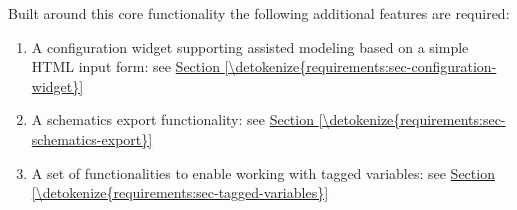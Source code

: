 \documentclass[letterpaper,10pt, openany,english]{sphinxmanual}
\begin{document}
Built around this core functionality the following additional features are required:
\begin{enumerate}
%
\item {} 
A configuration widget supporting assisted modeling based on a simple HTML input form: see \hyperref[\detokenize{requirements:sec-configuration-widget}]{Section \ref{\detokenize{requirements:sec-configuration-widget}}}

\item {} 
A schematics export functionality: see \hyperref[\detokenize{requirements:sec-schematics-export}]{Section \ref{\detokenize{requirements:sec-schematics-export}}}

\item {} 
A set of functionalities to enable working with tagged variables: see \hyperref[\detokenize{requirements:sec-tagged-variables}]{Section \ref{\detokenize{requirements:sec-tagged-variables}}}

\end{enumerate}
\end{document}
